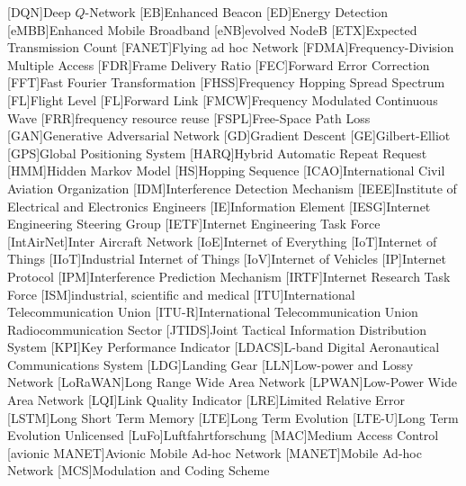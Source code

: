 \begin{acronym}
[DQN]{Deep $Q$-Network}
[EB]{Enhanced Beacon}
[ED]{Energy Detection}
[eMBB]{Enhanced Mobile Broadband}
[eNB]{evolved NodeB}
[ETX]{Expected Transmission Count}
[FANET]{Flying ad hoc Network}
[FDMA]{Frequency-Division Multiple Access}
[FDR]{Frame Delivery Ratio}
[FEC]{Forward Error Correction}
[FFT]{Fast Fourier Transformation}
[FHSS]{Frequency Hopping Spread Spectrum}
[FL]{Flight Level}
[FL]{Forward Link}
[FMCW]{Frequency Modulated Continuous Wave}
[FRR]{frequency resource reuse}
[FSPL]{Free-Space Path Loss}
[GAN]{Generative Adversarial Network}
[GD]{Gradient Descent}
[GE]{Gilbert-Elliot}
[GPS]{Global Positioning System}
[HARQ]{Hybrid Automatic Repeat Request}
[HMM]{Hidden Markov Model}
[HS]{Hopping Sequence}
[ICAO]{International Civil Aviation Organization}
[IDM]{Interference Detection Mechanism}
[IEEE]{Institute of Electrical and Electronics Engineers}
[IE]{Information Element}
[IESG]{Internet Engineering Steering Group}
[IETF]{Internet Engineering Task Force}
[IntAirNet]{Inter Aircraft Network}
[IoE]{Internet of Everything}
[IoT]{Internet of Things}
[IIoT]{Industrial Internet of Things}
[IoV]{Internet of Vehicles}
[IP]{Internet Protocol}
[IPM]{Interference Prediction Mechanism}
[IRTF]{Internet Research Task Force}
[ISM]{industrial, scientific and medical}
[ITU]{International Telecommunication Union}
[ITU-R]{International Telecommunication Union Radiocommunication Sector}
[JTIDS]{Joint Tactical Information Distribution System}
[KPI]{Key Performance Indicator}
[LDACS]{L-band Digital Aeronautical Communications System}
[LDG]{Landing Gear}
[LLN]{Low-power and Lossy Network}
[LoRaWAN]{Long Range Wide Area Network}
[LPWAN]{Low-Power Wide Area Network}
[LQI]{Link Quality Indicator}
[LRE]{Limited Relative Error}
[LSTM]{Long Short Term Memory}
[LTE]{Long Term Evolution}
[LTE-U]{Long Term Evolution Unlicensed}
[LuFo]{Luftfahrtforschung}
[MAC]{Medium Access Control}
[avionic MANET]{Avionic Mobile Ad-hoc Network}
[MANET]{Mobile Ad-hoc Network}
[MCS]{Modulation and Coding Scheme}

\end{acronym}
